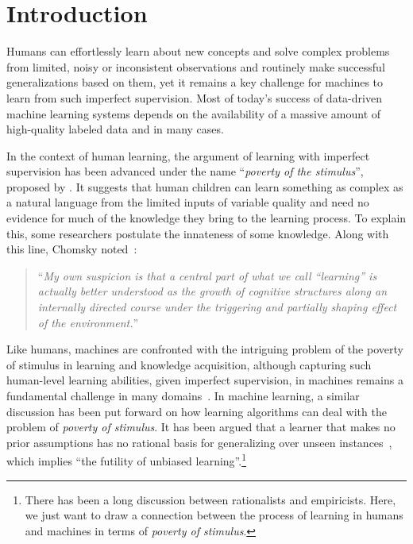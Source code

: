 \chapter{Introduction}
Humans can effortlessly learn about new concepts and solve complex problems from limited, noisy or inconsistent observations and routinely make successful generalizations based on them, yet it remains a key challenge for machines to learn from such imperfect supervision. Most of today's success of data-driven machine learning systems depends on the availability of a massive amount of high-quality labeled data and in many cases.

In the context of human learning, the argument of learning with imperfect supervision has been advanced under the name ``\emph{poverty of the stimulus}'', proposed by \citet{chomsky1980rules}. It suggests that human children can learn something as complex as a natural language from the limited inputs of variable quality and need no evidence for much of the knowledge they bring to the learning process. 
To explain this, some researchers postulate the innateness of some knowledge.
Along with this line, Chomsky noted~\citep{chomsky1980rules}:
\begin{quote}
    ``\emph{My own suspicion is that a central part of what we call “learning” is actually better understood as the growth of cognitive structures along an internally directed course under the triggering and partially shaping effect of the environment.}''
\end{quote}

Like humans, machines are confronted with the intriguing problem of the poverty of stimulus in learning and knowledge acquisition, although capturing such human-level learning abilities, given imperfect supervision, in machines remains a fundamental challenge in many domains~\citep{lake2017building}. 
%
In machine learning, a similar discussion has been put forward on how learning algorithms can deal with the problem of \emph{poverty of stimulus}. It has been argued that a learner that makes no prior assumptions has no rational basis for generalizing over unseen instances~\citep{Mitchell:1997:ML}, which implies ``the futility of unbiased learning''.\footnote{There has been a long discussion between rationalists and empiricists. Here, we just want to draw a connection between the process of learning in humans and machines in terms of \emph{poverty of stimulus}.}

